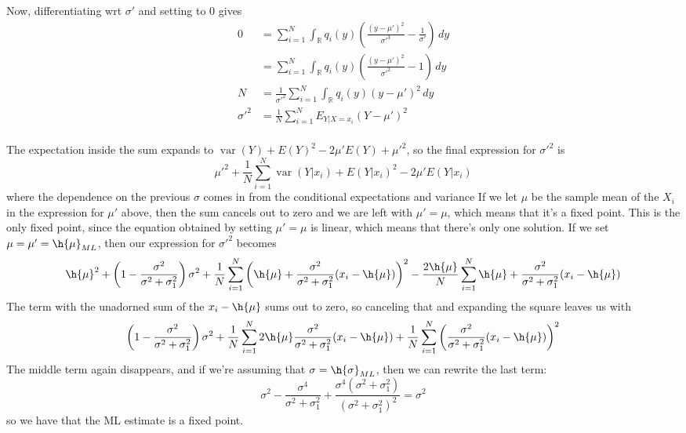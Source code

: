 \documentclass{article}
\DeclareMathOperator{\var}{var}
\newcommand{\rn}{\mathbb{R}}
\begin{document}
Now, differentiating wrt $\sigma'$ and setting to $0$ gives
\begin{align*}
    0&=\sum_{i=1}^N\int_\rn q_i(y)\left(\frac{(y-\mu')^2}{\sigma'^3}-\frac{1}{\sigma'}\right)\,dy\\
     &=\sum_{i=1}^N\int_\rn q_i(y)\left(\frac{(y-\mu')^2}{\sigma'^2}-1\right)\,dy\\
    N&=\frac{1}{\sigma'^2}\sum_{i=1}^N\int_\rn q_i(y)(y-\mu')^2\,dy\\
    \sigma'^2&=\frac{1}{N}\sum_{i=1}^NE_{Y|X=x_i}(Y-\mu')^2\\
\end{align*}

The expectation inside the sum expands to $\var(Y)+E(Y)^2-2\mu' E(Y)+\mu'^2$, so the final expression for $\sigma'^2$ is
\[\mu'^2+\frac{1}{N}\sum_{i=1}^N\var(Y|x_i)+E(Y|x_i)^2-2\mu'E(Y|x_i)\]
where the dependence on the previous $\sigma$ comes in from the conditional expectations and variance
If we let $\mu$ be the sample mean of the $X_i$ in the expression for $\mu'$ above, then the sum cancels out to zero and we are left with $\mu'=\mu$, which means that it's a fixed point. This is the only fixed point, since the equation obtained by setting $\mu'=\mu$ is linear, which means that there's only one solution.
If we set $\mu=\mu'=\h{\mu}_{ML}$, then our expression for $\sigma'^2$ becomes
\[\h{\mu}^2+\left(1-\frac{\sigma^2}{\sigma^2+\sigma_1^2}\right)\sigma^2+\frac{1}{N}\sum_{i=1}^N\left(\h{\mu}+\frac{\sigma^2}{\sigma^2+\sigma_1^2}(x_i-\h{\mu})\right)^2-\frac{2\h{\mu}}{N}\sum_{i=1}^N\h{\mu}+\frac{\sigma^2}{\sigma^2+\sigma_1^2}(x_i-\h{\mu})\]
The term with the unadorned sum of the $x_i-\h{\mu}$ sums out to zero, so canceling that and expanding the square leaves us with
\[\left(1-\frac{\sigma^2}{\sigma^2+\sigma_1^2}\right)\sigma^2+\frac{1}{N}\sum_{i=1}^N2\h{\mu}\frac{\sigma^2}{\sigma^2+\sigma_1^2}(x_i-\h{\mu})+\frac{1}{N}\sum_{i=1}^N\left(\frac{\sigma^2}{\sigma^2+\sigma_1^2}(x_i-\h{\mu})\right)^2\]
The middle term again disappears, and if we're assuming that $\sigma=\h{\sigma}_{ML}$, then we can rewrite the last term:
\[\sigma^2-\frac{\sigma^4}{\sigma^2+\sigma_1^2}+\frac{\sigma^4(\sigma^2+\sigma_1^2)}{(\sigma^2+\sigma_1^2)^2}=\sigma^2\]
so we have that the ML estimate is a fixed point.
\end{document}
